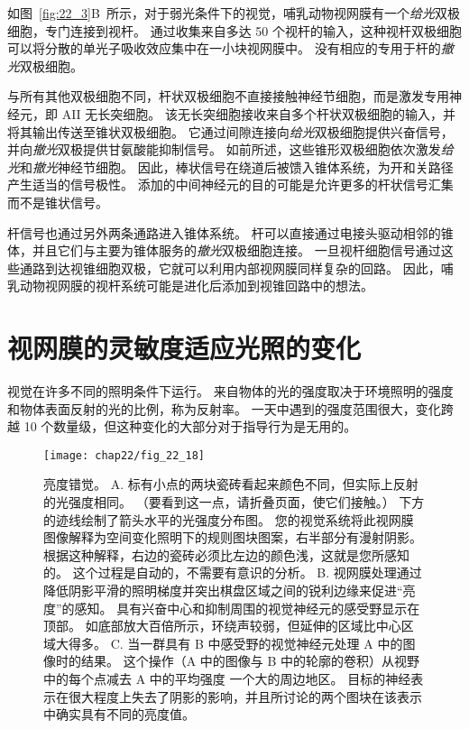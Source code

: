 如图~\ref{fig:22_3}B~所示，对于弱光条件下的视觉，哺乳动物视网膜有一个\textit{给光}双极细胞，专门连接到视杆。
通过收集来自多达 50 个视杆的输入，这种视杆双极细胞可以将分散的单光子吸收效应集中在一小块视网膜中。 
没有相应的专用于杆的\textit{撤光}双极细胞。


与所有其他双极细胞不同，杆状双极细胞不直接接触神经节细胞，而是激发专用神经元，即 AII 无长突细胞。
该无长突细胞接收来自多个杆状双极细胞的输入，并将其输出传送至锥状双极细胞。
它通过间隙连接向\textit{给光}双极细胞提供兴奋信号，并向\textit{撤光}双极提供甘氨酸能抑制信号。
如前所述，这些锥形双极细胞依次激发\textit{给光}和\textit{撤光}神经节细胞。
因此，棒状信号在绕道后被馈入锥体系统，为开和关路径产生适当的信号极性。
添加的中间神经元的目的可能是允许更多的杆状信号汇集而不是锥状信号。


杆信号也通过另外两条通路进入锥体系统。
杆可以直接通过电接头驱动相邻的锥体，并且它们与主要为锥体服务的\textit{撤光}双极细胞连接。
一旦视杆细胞信号通过这些通路到达视锥细胞双极，它就可以利用内部视网膜同样复杂的回路。
因此，哺乳动物视网膜的视杆系统可能是进化后添加到视锥回路中的想法。



\section{视网膜的灵敏度适应光照的变化}

视觉在许多不同的照明条件下运行。
来自物体的光的强度取决于环境照明的强度和物体表面反射的光的比例，称为反射率。
一天中遇到的强度范围很大，变化跨越 10 个数量级，但这种变化的大部分对于指导行为是无用的。


\begin{figure}[htbp]
	\centering
	\texttt{[image: chap22/fig\_22\_18]}
	\caption{亮度错觉。 
		A. 标有小点的两块瓷砖看起来颜色不同，但实际上反射的光强度相同。
		（要看到这一点，请折叠页面，使它们接触。）
		下方的迹线绘制了箭头水平的光强度分布图。 
		您的视觉系统将此视网膜图像解释为空间变化照明下的规则图块图案，右半部分有漫射阴影。 
		根据这种解释，右边的瓷砖必须比左边的颜色浅，这就是您所感知的。
		这个过程是自动的，不需要有意识的分析。 
		B. 视网膜处理通过降低阴影平滑的照明梯度并突出棋盘区域之间的锐利边缘来促进“亮度”的感知。 
		具有兴奋中心和抑制周围的视觉神经元的感受野显示在顶部。 
		如底部放大百倍所示，环绕声较弱，但延伸的区域比中心区域大得多。
		C. 当一群具有 B 中感受野的视觉神经元处理 A 中的图像时的结果。
		这个操作（A 中的图像与 B 中的轮廓的卷积）从视野中的每个点减去 A 中的平均强度 一个大的周边地区。
		目标的神经表示在很大程度上失去了阴影的影响，并且所讨论的两个图块在该表示中确实具有不同的亮度值。}
	\label{fig:22_18}
\end{figure}


